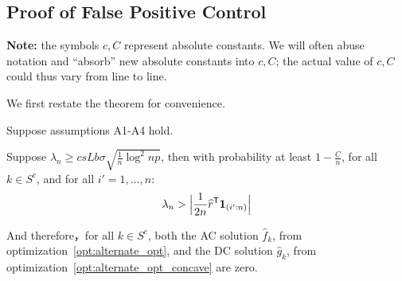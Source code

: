  
 
 
 
 
 \subsection{Proof of False Positive Control}
 \label{sec:false_positive_proof}
 
\textbf{Note:} the symbols $c,C$ represent absolute constants. We will often abuse notation and ``absorb'' new absolute constants into $c, C$; the actual value of $c, C$ could thus vary from line to line.

 We first restate the theorem for convenience. 
 

\begin{theorem} 
Suppose assumptions A1-A4 hold. 

Suppose $\lambda_n \geq c s Lb \sigma  \sqrt{ \frac{1}{n} \log^2 np}$, then with probability at least $ 1 - \frac{C}{n}$, for all $k \in S^c$, and for all $i'=1,...,n$:
\[
\lambda_n > \Big| \frac{1}{2n}\widehat{r}^{\mathsf{T}} \mbox{\boldmath $1$}_{(i':n)} \Big|
\]

And therefore，for all $k \in S^c$, both the AC solution $\hat{f}_k$, from optimization~\ref{opt:alternate_opt}, and the DC solution $\hat{g}_k$, from optimization~\ref{opt:alternate_opt_concave} are zero. 
\end{theorem}

